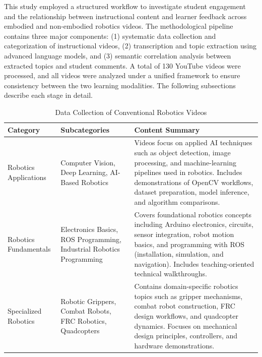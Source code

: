 
This study employed a structured workflow to investigate student engagement and the relationship between instructional content and learner feedback across embodied and non-embodied robotics videos. The methodological pipeline contains three major components: (1) systematic data collection and categorization of instructional videos, (2) transcription and topic extraction using advanced language models, and (3) semantic correlation analysis between extracted topics and student comments. A total of 130 YouTube videos were processed, and all videos were analyzed under a unified framework to ensure consistency between the two learning modalities. The following subsections describe each stage in detail.




\begin{table}[ht]
    \centering
    \caption{Data Collection of Conventional Robotics Videos}
    \begin{tabular}{p{3cm} p{3cm} p{7cm}}
        \toprule
        \textbf{Category} & \textbf{Subcategories} & \textbf{Content Summary} \\
        \midrule
        
        Robotics Applications 
        & Computer Vision, Deep Learning, AI-Based Robotics 
        & Videos focus on applied AI techniques such as object detection, image processing, and machine-learning pipelines used in robotics. Includes demonstrations of OpenCV workflows, dataset preparation, model inference, and algorithm comparisons. \\[6pt]
        
        Robotics Fundamentals
        & Electronics Basics, ROS Programming, Industrial Robotics Programming 
        & Covers foundational robotics concepts including Arduino electronics, circuits, sensor integration, robot motion basics, and programming with ROS (installation, simulation, and navigation). Includes teaching-oriented technical walkthroughs. \\[6pt]
        
        Specialized Robotics
        & Robotic Grippers, Combat Robots, FRC Robotics, Quadcopters 
        & Contains domain-specific robotics topics such as gripper mechanisms, combat robot construction, FRC design workflows, and quadcopter dynamics. Focuses on mechanical design principles, controllers, and hardware demonstrations. \\
        
        \bottomrule
    \end{tabular}
    \label{tab:categorized_videos}
\end{table}

